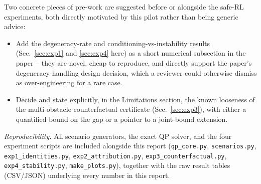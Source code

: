 \documentclass[11pt]{article}
\begin{document}
Two concrete pieces of pre-work are suggested before or alongside the safe-RL
experiments, both directly motivated by this pilot rather than being
generic advice:
\begin{itemize}[leftmargin=1.6em]
\item Add the degeneracy-rate and conditioning-vs-instability results
      (Sec.~\ref{sec:exp1} and \ref{sec:exp4} here) as a short numerical
      subsection in the paper -- they are novel, cheap to reproduce, and
      directly support the paper's degeneracy-handling design decision,
      which a reviewer could otherwise dismiss as over-engineering for a
      rare case.
\item Decide and state explicitly, in the Limitations section, the known
      looseness of the multi-obstacle counterfactual certificate
      (Sec.~\ref{sec:exp3}), with either a quantified bound on the gap or a
      pointer to a joint-bound extension.
\end{itemize}

\vspace{6pt}
\noindent\textit{Reproducibility.} All scenario generators, the exact QP
solver, and the four experiment scripts are included alongside this report
(\texttt{qp\_core.py}, \texttt{scenarios.py}, \texttt{exp1\_identities.py},
\texttt{exp2\_attribution.py}, \texttt{exp3\_counterfactual.py},
\texttt{exp4\_stability.py}, \texttt{make\_plots.py}), together with the raw
result tables (CSV/JSON) underlying every number in this report.
\end{document}
